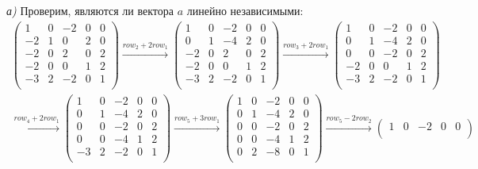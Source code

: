\documentclass[a4paper,11pt]{article}
\begin{document}
\textsl{а)} Проверим, являются ли  вектора $ a $  линейно независимыми:
\begin{gather*}
\begin{pmatrix}
1 & 0 & -2 & 0 & 0 \\
-2 & 1 & 0 & 2 & 0 \\
-2 & 0 & 2 & 0 & 2 \\
-2 & 0 & 0 & 1 & 2 \\
-3 & 2 & -2 & 0 & 1 \\
\end{pmatrix}
\stackrel{ row_{2} + 2row_{1} }{\longrightarrow}
\begin{pmatrix}
1 & 0 & -2 & 0 & 0 \\
0 & 1 & -4 & 2 & 0 \\
-2 & 0 & 2 & 0 & 2 \\
-2 & 0 & 0 & 1 & 2 \\
-3 & 2 & -2 & 0 & 1 \\
\end{pmatrix}
\stackrel{ row_{3} + 2row_{1} }{\longrightarrow}
\begin{pmatrix}
1 & 0 & -2 & 0 & 0 \\
0 & 1 & -4 & 2 & 0 \\
0 & 0 & -2 & 0 & 2 \\
-2 & 0 & 0 & 1 & 2 \\
-3 & 2 & -2 & 0 & 1 \\
\end{pmatrix}
\\[3pt]
\stackrel{ row_{4} + 2row_{1} }{\longrightarrow}
\begin{pmatrix}
1 & 0 & -2 & 0 & 0 \\
0 & 1 & -4 & 2 & 0 \\
0 & 0 & -2 & 0 & 2 \\
0 & 0 & -4 & 1 & 2 \\
-3 & 2 & -2 & 0 & 1 \\
\end{pmatrix}
\stackrel{ row_{5} + 3row_{1} }{\longrightarrow}
\begin{pmatrix}
1 & 0 & -2 & 0 & 0 \\
0 & 1 & -4 & 2 & 0 \\
0 & 0 & -2 & 0 & 2 \\
0 & 0 & -4 & 1 & 2 \\
0 & 2 & -8 & 0 & 1 \\
\end{pmatrix}
\stackrel{ row_{5} - 2row_{2} }{\longrightarrow}
\begin{pmatrix}
1 & 0 & -2 & 0 & 0 \\

\end{pmatrix}
\end{gather*}
\end{document}
